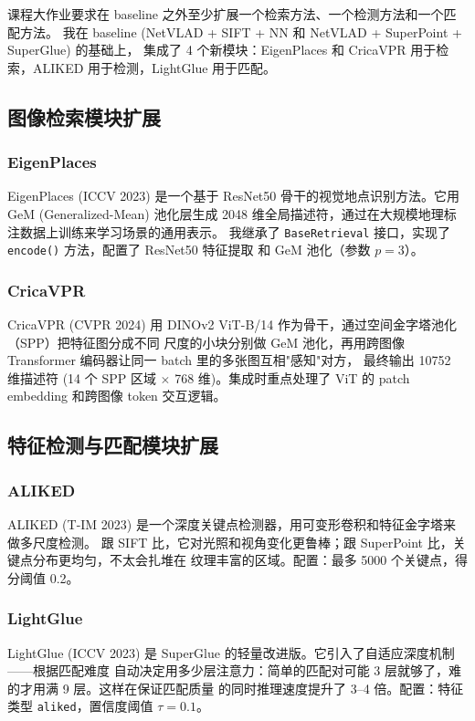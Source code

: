 \documentclass[12pt,a4paper]{ctexart}
\begin{document}
课程大作业要求在 baseline 之外至少扩展一个检索方法、一个检测方法和一个匹配方法。
我在 baseline (NetVLAD + SIFT + NN 和 NetVLAD + SuperPoint + SuperGlue) 的基础上，
集成了 4 个新模块：EigenPlaces 和 CricaVPR 用于检索，ALIKED 用于检测，LightGlue 用于匹配。

\subsection{图像检索模块扩展}

\subsubsection{EigenPlaces}
EigenPlaces (ICCV 2023) 是一个基于 ResNet50 骨干的视觉地点识别方法。它用 GeM (Generalized-Mean)
池化层生成 2048 维全局描述符，通过在大规模地理标注数据上训练来学习场景的通用表示。
我继承了 \texttt{BaseRetrieval} 接口，实现了 \texttt{encode()} 方法，配置了 ResNet50 特征提取
和 GeM 池化（参数 $p=3$）。

\subsubsection{CricaVPR}
CricaVPR (CVPR 2024) 用 DINOv2 ViT-B/14 作为骨干，通过空间金字塔池化（SPP）把特征图分成不同
尺度的小块分别做 GeM 池化，再用跨图像 Transformer 编码器让同一 batch 里的多张图互相"感知"对方，
最终输出 10752 维描述符 (14 个 SPP 区域 $\times$ 768 维)。集成时重点处理了 ViT 的 patch embedding
和跨图像 token 交互逻辑。

\subsection{特征检测与匹配模块扩展}

\subsubsection{ALIKED}
ALIKED (T-IM 2023) 是一个深度关键点检测器，用可变形卷积和特征金字塔来做多尺度检测。
跟 SIFT 比，它对光照和视角变化更鲁棒；跟 SuperPoint 比，关键点分布更均匀，不太会扎堆在
纹理丰富的区域。配置：最多 5000 个关键点，得分阈值 0.2。

\subsubsection{LightGlue}
LightGlue (ICCV 2023) 是 SuperGlue 的轻量改进版。它引入了自适应深度机制——根据匹配难度
自动决定用多少层注意力：简单的匹配对可能 3 层就够了，难的才用满 9 层。这样在保证匹配质量
的同时推理速度提升了 3--4 倍。配置：特征类型 \texttt{aliked}，置信度阈值 $\tau = 0.1$。
\end{document}
